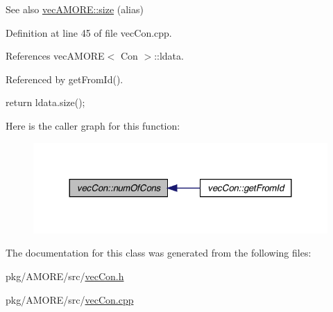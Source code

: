 \begin{DoxySeeAlso}{See also}
\hyperlink{classvec_a_m_o_r_e_ae1289a7870dbdd19b6455a890e94ce48}{vecAMORE::size} (alias) 
\end{DoxySeeAlso}


Definition at line 45 of file vecCon.cpp.



References vecAMORE$<$ Con $>$::ldata.



Referenced by getFromId().


\begin{DoxyCode}
                       {
        return ldata.size();
}
\end{DoxyCode}


Here is the caller graph for this function:\nopagebreak
\begin{figure}[H]
\begin{center}
\leavevmode
\includegraphics[width=324pt]{classvec_con_a1e39a5e78c40ae8af9bbd2fd7f0dc749_icgraph}
\end{center}
\end{figure}




The documentation for this class was generated from the following files:\begin{DoxyCompactItemize}
\item 
pkg/AMORE/src/\hyperlink{vec_con_8h}{vecCon.h}\item 
pkg/AMORE/src/\hyperlink{vec_con_8cpp}{vecCon.cpp}\end{DoxyCompactItemize}
